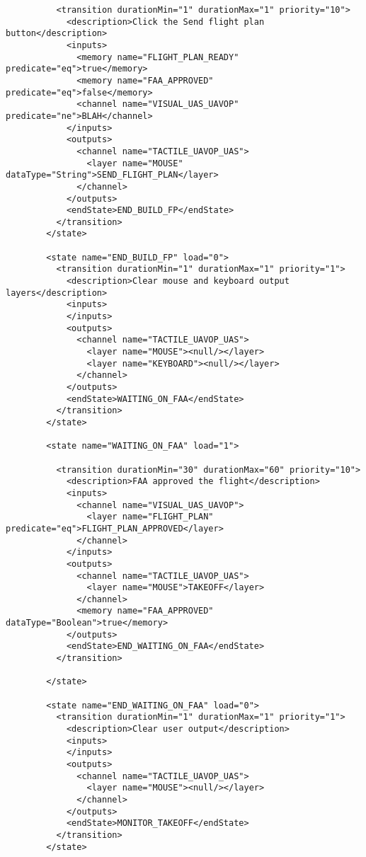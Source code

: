\begin{verbatim}
          <transition durationMin="1" durationMax="1" priority="10">
            <description>Click the Send flight plan button</description>
            <inputs>
              <memory name="FLIGHT_PLAN_READY" predicate="eq">true</memory>
              <memory name="FAA_APPROVED" predicate="eq">false</memory>
              <channel name="VISUAL_UAS_UAVOP" predicate="ne">BLAH</channel>
            </inputs>
            <outputs>
              <channel name="TACTILE_UAVOP_UAS">
                <layer name="MOUSE" dataType="String">SEND_FLIGHT_PLAN</layer>
              </channel>
            </outputs>
            <endState>END_BUILD_FP</endState>
          </transition>
        </state>
        
        <state name="END_BUILD_FP" load="0">
          <transition durationMin="1" durationMax="1" priority="1">
            <description>Clear mouse and keyboard output layers</description>
            <inputs>
            </inputs>
            <outputs>
              <channel name="TACTILE_UAVOP_UAS">
                <layer name="MOUSE"><null/></layer>
                <layer name="KEYBOARD"><null/></layer>
              </channel>
            </outputs>
            <endState>WAITING_ON_FAA</endState>
          </transition>
        </state>
        
        <state name="WAITING_ON_FAA" load="1">
          
          <transition durationMin="30" durationMax="60" priority="10">
            <description>FAA approved the flight</description>
            <inputs>
              <channel name="VISUAL_UAS_UAVOP">
                <layer name="FLIGHT_PLAN" predicate="eq">FLIGHT_PLAN_APPROVED</layer>
              </channel>
            </inputs>
            <outputs>
              <channel name="TACTILE_UAVOP_UAS">
                <layer name="MOUSE">TAKEOFF</layer>
              </channel>
              <memory name="FAA_APPROVED" dataType="Boolean">true</memory>
            </outputs>
            <endState>END_WAITING_ON_FAA</endState>
          </transition>
          
        </state>
        
        <state name="END_WAITING_ON_FAA" load="0">
          <transition durationMin="1" durationMax="1" priority="1">
            <description>Clear user output</description>
            <inputs>
            </inputs>
            <outputs>
              <channel name="TACTILE_UAVOP_UAS">
                <layer name="MOUSE"><null/></layer>
              </channel>
            </outputs>
            <endState>MONITOR_TAKEOFF</endState>
          </transition>
        </state>
        

\end{verbatim}
